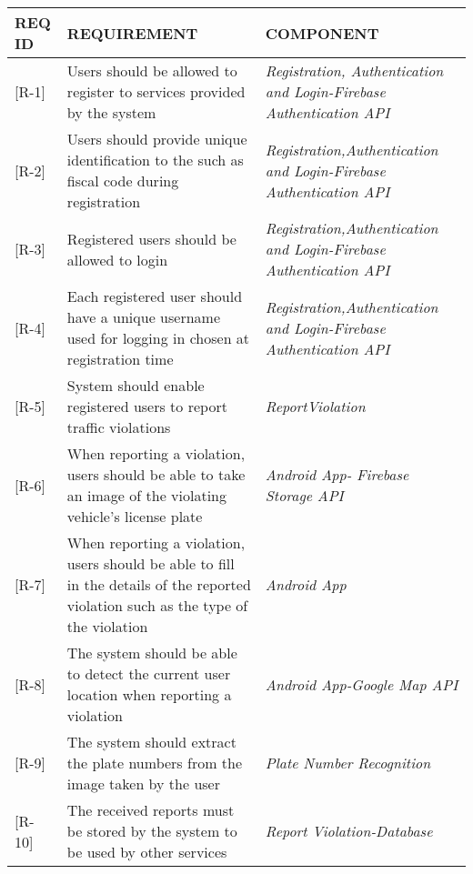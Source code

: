 \begin{longtable}{| p{} |p{} | p{} |}
\hline
 \textbf{REQ ID} & \textbf{REQUIREMENT} & \textbf{COMPONENT}   \\ \hline

 [R-1] & Users should be allowed to register to services provided by the system & \emph{Registration, Authentication and Login-Firebase Authentication API} \\ \hline

 [R-2] & Users should provide unique identification to the such as fiscal code during registration & \emph{Registration,Authentication and Login-Firebase Authentication API} 		\\ \hline

 [R-3] & Registered users should be allowed to login & \emph{Registration,Authentication and Login-Firebase Authentication API} 		\\ \hline

 [R-4] & Each registered user should have a unique username used for logging in chosen at registration time & \emph{Registration,Authentication and Login-Firebase Authentication API} 		\\ \hline

 [R-5] & System should enable registered users to report traffic violations & \emph{ReportViolation} 		\\ \hline

 [R-6] & When reporting a violation, users should be able to take an image of the violating vehicle’s license plate& \emph{Android App- Firebase Storage API} 		\\ \hline

 [R-7] & When reporting a violation, users should be able to fill in the details of the reported violation such as the type of the violation & \emph{Android App} 		\\ \hline

 [R-8] & The system should be able to detect the current user location when reporting a violation & \emph{Android App-Google Map API } 		\\ \hline

 [R-9] & The system should extract the plate numbers from the image taken by the user & \emph{ Plate Number Recognition} 		\\ \hline

 [R-10] & The received reports must be stored by the system to be used by other services & \emph{Report Violation-Database} 		\\ \hline


\end{longtable}
